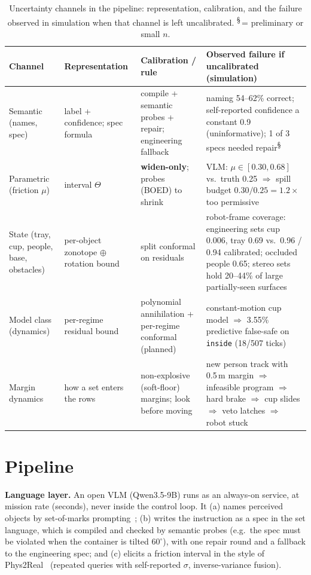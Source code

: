 \documentclass[10pt,twocolumn,letterpaper]{article}
\newcommand{\pre}{\textsuperscript{\S}}   %
\begin{document}
\begin{table}[t]
\centering\small
\caption{Uncertainty channels in the pipeline: representation, calibration, and the failure observed in simulation when that channel
is left uncalibrated. \pre\,= preliminary or small $n$.}
\label{tab:uq}
\begin{tabular}{@{}p{2.6cm}p{2.9cm}p{3.3cm}p{7.3cm}@{}}
\toprule
Channel & Representation & Calibration / rule & Observed failure if uncalibrated (simulation)\\
\midrule
Semantic (names, spec) & label + confidence; spec formula & compile + semantic probes + repair; engineering fallback &
naming 54--62\% correct; self-reported confidence a constant 0.9 (uninformative); 1 of 3 specs needed repair\pre\\
Parametric (friction $\mu$) & interval $\Theta$ & \textbf{widen-only}; probes (BOED) to shrink &
VLM: $\mu\in[0.30,0.68]$ vs.\ truth 0.25 $\Rightarrow$ spill budget $0.30/0.25=1.2\times$ too permissive\\
State (tray, cup, people, base, obstacles) & per-object zonotope $\oplus$ rotation bound & split conformal on residuals &
robot-frame coverage: engineering sets cup 0.006, tray 0.69 vs.\ 0.96 / 0.94 calibrated; occluded people 0.65; stereo sets hold 20--44\% of large partially-seen surfaces\\
Model class (dynamics) & per-regime residual bound & polynomial annihilation + per-regime conformal (planned) &
constant-motion cup model $\Rightarrow$ 3.55\% predictive false-safe on \texttt{inside} (18/507 ticks)\\
Margin dynamics & how a set enters the rows & non-explosive (soft-floor) margins; look before moving &
new person track with 0.5\,m margin $\Rightarrow$ infeasible program $\Rightarrow$ hard brake $\Rightarrow$ cup slides $\Rightarrow$ veto latches $\Rightarrow$ robot stuck\\
\bottomrule
\end{tabular}
\vspace{-2mm}
\end{table}

\section{Pipeline}\label{sec:pipeline}

\textbf{Language layer.} An open VLM (Qwen3.5-9B) runs as an always-on service, at mission rate (seconds), never inside the control loop.
It (a) names perceived objects by set-of-marks prompting~\cite{som}; (b) writes the instruction as a spec in the set language, which is
compiled and checked by semantic probes (e.g.\ the spec must be violated when the container is tilted $60^\circ$), with one repair round
and a fallback to the engineering spec; and (c) elicits a friction interval in the style of Phys2Real~\cite{phys2real} (repeated queries
with self-reported $\sigma$, inverse-variance fusion).
\end{document}
